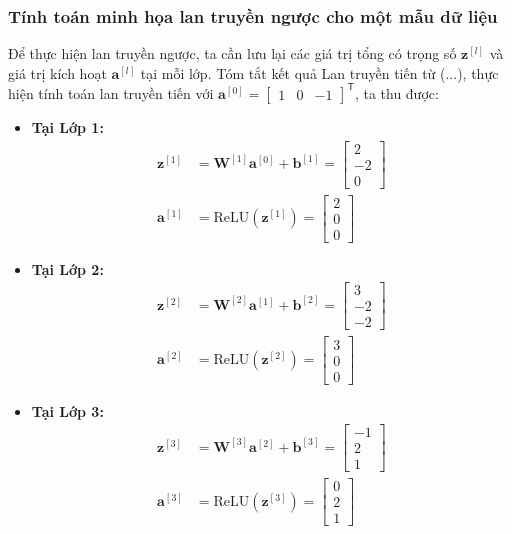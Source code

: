 \subsubsection{Tính toán minh họa lan truyền ngược cho một mẫu dữ liệu}

Để thực hiện lan truyền ngược, ta cần lưu lại các giá trị tổng có trọng số $\mathbf{z}^{[l]}$ và giá trị kích hoạt $\mathbf{a}^{[l]}$ tại mỗi lớp. Tóm tắt kết quả Lan truyền tiến từ (...), thực hiện tính toán lan truyền tiến với $\mathbf{a}^{[0]} = \begin{bmatrix} 1 & 0 & -1 \end{bmatrix}^{\mathsf{T}}$, ta thu được:

\begin{itemize}
    \item \textbf{Tại Lớp 1:}
    \begin{align*}
    \mathbf{z}^{[1]} &= \mathbf{W}^{[1]}\mathbf{a}^{[0]} + \mathbf{b}^{[1]} = \begin{bmatrix} 2 \\ -2 \\ 0 \end{bmatrix} \\
    \mathbf{a}^{[1]} &= \text{ReLU}(\mathbf{z}^{[1]}) = \begin{bmatrix} 2 \\ 0 \\ 0 \end{bmatrix}
    \end{align*}
    
    \item \textbf{Tại Lớp 2:}
    \begin{align*}
    \mathbf{z}^{[2]} &= \mathbf{W}^{[2]}\mathbf{a}^{[1]} + \mathbf{b}^{[2]} = \begin{bmatrix} 3 \\ -2 \\ -2 \end{bmatrix} \\
    \mathbf{a}^{[2]} &= \text{ReLU}(\mathbf{z}^{[2]}) = \begin{bmatrix} 3 \\ 0 \\ 0 \end{bmatrix}
    \end{align*}
    
    \item \textbf{Tại Lớp 3:}
    \begin{align*}
    \mathbf{z}^{[3]} &= \mathbf{W}^{[3]}\mathbf{a}^{[2]} + \mathbf{b}^{[3]} = \begin{bmatrix} -1 \\ 2 \\ 1 \end{bmatrix} \\
    \mathbf{a}^{[3]} &= \text{ReLU}(\mathbf{z}^{[3]}) = \begin{bmatrix} 0 \\ 2 \\ 1 \end{bmatrix}
    \end{align*}
    

\end{itemize}
